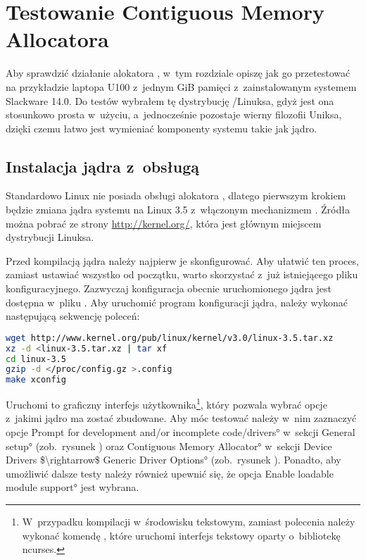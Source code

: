 \chapter{Testowanie Contiguous Memory Allocatora}

Aby sprawdzić działanie alokatora , w~tym rozdziale opiszę
jak go przetestować na przykładzie laptopa  U100 z~jednym
\unit{GiB} pamięci  z~zainstalowanym systemem Slackware 14.0.
Do testów wybrałem tę dystrybucję /Linuksa, gdyż jest ona
stosunkowo prosta w~użyciu, a~jednocześnie pozostaje wierny filozofii
Uniksa, dzięki czemu łatwo jest wymieniać komponenty systemu takie jak
jądro.


\section{Instalacja jądra z~obsługą }

Standardowo Linux nie posiada obsługi alokatora , dlatego pierwszym
krokiem będzie zmiana jądra systemu na Linux 3.5 z~włączonym
mechanizmem .  Źródła można pobrać ze strony
\url{http://kernel.org/}, która jest głównym miejscem dystrybucji
Linuksa.

Przed kompilacją jądra należy najpierw je skonfigurować.  Aby ułatwić
ten proces, zamiast ustawiać wszystko od początku, warto skorzystać
z~już istniejącego pliku konfiguracyjnego.  Zazwyczaj konfiguracja
obecnie uruchomionego jądra jest dostępna w~pliku
.  Aby uruchomić program konfiguracji jądra,
należy wykonać następującą sekwencję poleceń:

\begin{lstlisting}[language=sh,numbers=none]
wget http://www.kernel.org/pub/linux/kernel/v3.0/linux-3.5.tar.xz
xz -d <linux-3.5.tar.xz | tar xf
cd linux-3.5
gzip -d </proc/config.gz >.config
make xconfig
\end{lstlisting}

Uruchomi to graficzny interfejs użytkownika\footnote{W~przypadku
  kompilacji w~środowisku tekstowym, zamiast polecenia  należy wykonać komendę , które
  uruchomi interfejs tekstowy oparty o~bibliotekę ncurses.}, który
pozwala wybrać opcje z~jakimi jądro ma zostać zbudowane.  Aby móc
testować  należy w~nim zaznaczyć opcje \ang*{Prompt for development
  and/or incomplete code/drivers} w~sekcji \ang*{General setup}
(zob.\ rysunek ) oraz \ang*{Contiguous Memory
  Allocator} w~sekcji \ang*{Device Drivers $\rightarrow$ Generic
  Driver Options} (zob.\ rysunek ).  Ponadto,
aby umożliwić dalsze testy należy również upewnić się, że opcja
\ang*{Enable loadable module support} jest wybrana.

